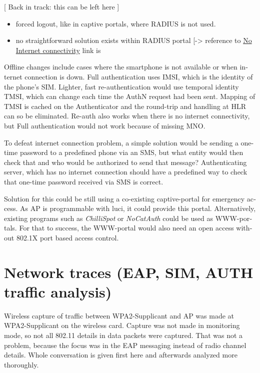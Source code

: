 \documentclass[12pt,a4paper,english]{tutthesis}
\begin{document}
\begin{otherlanguage}{english}
[ Back in track: this can be left here ]

\begin{itemize}
\item forced logout, like in captive portals, where RADIUS is not used.
\item no straightforward solution exists within RADIUS
portal [-> reference to \hyperref[text:nointernet]{No Internet connectivity} link is
\end{itemize}

Offline changes include cases where the smartphone is not available or
when internet connection is down.  Full authentication uses IMSI,
which is the identity of the phone's SIM.  Lighter, fast
re-authentication would use temporal identity TMSI, which can change
each time the AuthN request had been sent. Mapping of TMSI is cached
on the Authenticator and the round-trip and handling at HLR can so be
eliminated. Re-auth also works when there is no internet connectivity,
but Full authentication would not work because of missing MNO.



To defeat internet connection problem, a simple solution would be
sending a one-time password to a predefined phone via an SMS, but what
entity would then check that and who would be authorized to send that message?
Authenticating server, which has no internet connection should 
have a predefined way to check that one-time password received via SMS is correct.

Solution for this could be still using a co-existing captive-portal
for emergency access. As AP is programmable with luci, it could
provide this portal.  Alternatively, existing programs such as
\emph{ChilliSpot} or \emph{NoCatAuth} could be used as WWW-portals.  For that to
success, the WWW-portal would also need an open access without 802.1X
port based access control.


\section{Network traces (EAP, SIM, AUTH traffic analysis)}
\label{sec-5-4}
Wireless capture of traffic between WPA2-Supplicant and AP was made at
WPA2-Supplicant on the wireless card. Capture was
not made in monitoring mode, so not all 802.11 details in
data packets were captured\cite{wireshark-capture}.
That was not a problem, because the focus was 
in the EAP messaging instead of radio channel details.
Whole conversation is given first here and afterwards analyzed more
thoroughly.


\end{otherlanguage}
\end{document}
